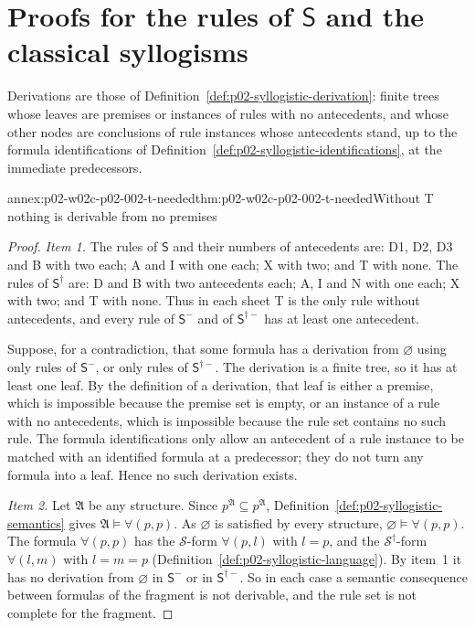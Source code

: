 \section{Proofs for the rules of \texorpdfstring{\(\mathsf S\)}{S} and the classical syllogisms}
\label{sec:annex-p02-w02c-p02-002-rules}

Derivations are those of Definition~\ref{def:p02-syllogistic-derivation}:
finite trees whose leaves are premises or instances of rules with no
antecedents, and whose other nodes are conclusions of rule instances whose
antecedents stand, up to the formula identifications of
Definition~\ref{def:p02-syllogistic-identifications}, at the immediate
predecessors.

\begin{annexitem}{annex:p02-w02c-p02-002-t-needed}{thm:p02-w02c-p02-002-t-needed}{Without T nothing is derivable from no premises}
\begin{proof}
\emph{Item 1.} The rules of \(\mathsf S\) and their numbers of antecedents
are: D1, D2, D3 and B with two each; A and I with one each; X with two; and T
with none. The rules of \(\mathsf S^\dagger\) are: D and B with two
antecedents each; A, I and N with one each; X with two; and T with none.
Thus in each sheet T is the only rule without antecedents, and every rule of
\(\mathsf S^-\) and of \(\mathsf S^{\dagger-}\) has at least one antecedent.

Suppose, for a contradiction, that some formula has a derivation from
\(\varnothing\) using only rules of \(\mathsf S^-\), or only rules of
\(\mathsf S^{\dagger-}\). The derivation is a finite tree, so it has at least
one leaf. By the definition of a derivation, that leaf is either a premise,
which is impossible because the premise set is empty, or an instance of a
rule with no antecedents, which is impossible because the rule set contains
no such rule. The formula identifications only allow an antecedent of a rule
instance to be matched with an identified formula at a predecessor; they do
not turn any formula into a leaf. Hence no such derivation exists.

\emph{Item 2.} Let \(\mathfrak A\) be any structure. Since
\(p^{\mathfrak A}\subseteq p^{\mathfrak A}\),
Definition~\ref{def:p02-syllogistic-semantics} gives
\(\mathfrak A\models\forall(p,p)\). As \(\varnothing\) is satisfied by every
structure, \(\varnothing\models\forall(p,p)\). The formula \(\forall(p,p)\) has
the \(\mathcal S\)-form \(\forall(p,l)\) with \(l=p\), and the
\(\mathcal S^\dagger\)-form \(\forall(l,m)\) with \(l=m=p\)
(Definition~\ref{def:p02-syllogistic-language}). By item~1 it has no
derivation from \(\varnothing\) in \(\mathsf S^-\) or in
\(\mathsf S^{\dagger-}\). So in each case a semantic consequence between
formulas of the fragment is not derivable, and the rule set is not complete
for the fragment.


\end{proof}
\end{annexitem}
